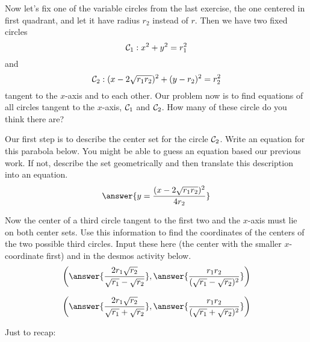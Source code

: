 \documentclass{ximera}
\begin{document}
\begin{exploration}   \label{Ex2434634:Spheres}
Now let's fix one of the variable circles from the last exercise, the one centered in first quadrant, and let it have radius $r_2$ instead of $r$. Then we have two fixed circles
\[
   {\cal C}_1: x^2 + y^2 = r_1^2
\]
and
\[
  {\cal C}_2:  (x-2\sqrt{r_1r_2})^2 + (y-r_2)^2 = r_2^2
\]
tangent to the $x$-axis and to each other. Our problem now is to find equations of all circles tangent to the $x$-axis, ${\cal C}_1$ and ${\cal C}_2$. How many of these circle do you think there are?


\begin{question}   \label{Q5693:Spheres}
Our first step is to describe the center set for the circle ${\cal C}_2$. Write an equation for this parabola below. You might be able to guess an equation based our previous work. If not, describe the set geometrically and then translate this description into an equation. 
\[
    \answer{y=\frac{(x-2\sqrt{r_1r_2})^2}{4r_2}}
\]
\end{question}

Now the center of a third circle tangent to the first two and the $x$-axis must lie on both center sets. Use this information to find the coordinates of the centers of the two possible third circles. Input these here (the center with the smaller $x$-coordinate first) and in the desmos activity below.
\[
   \left( \answer{\frac{2r_1\sqrt{r_2}}{\sqrt{r_1} -\sqrt{r_2}}} , \answer{\frac{r_1 r_2}{(\sqrt{r_1} -\sqrt{r_2})^2}}  \right) 
\]

\[
   \left( \answer{\frac{2r_1\sqrt{r_2}}{\sqrt{r_1} +\sqrt{r_2}}} , \answer{\frac{r_1 r_2}{(\sqrt{r_1} +\sqrt{r_2})^2}}  \right) 
\]


 
\begin{onlineOnly}
    \begin{center}
\end{center}
\end{onlineOnly}
\end{exploration}

Just to recap:
\end{document}
